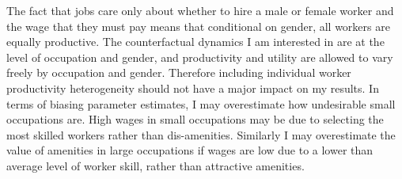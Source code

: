 \documentclass[11pt]{article}
\begin{document}
The fact that jobs care only about whether to hire a male or female worker and the wage that they must pay means that conditional on gender, all workers are equally productive. The counterfactual dynamics I am interested in are at the level of occupation and gender, and productivity and utility are allowed to vary freely by occupation and gender. Therefore including individual worker productivity heterogeneity should not have a major impact on my results. In terms of biasing parameter estimates, I may overestimate how undesirable small occupations are. High wages in small occupations may be due to selecting the most skilled workers rather than dis-amenities. Similarly I may overestimate the value of amenities in large occupations if wages are low due to a lower than average level of worker skill, rather than attractive amenities.








\end{document}
